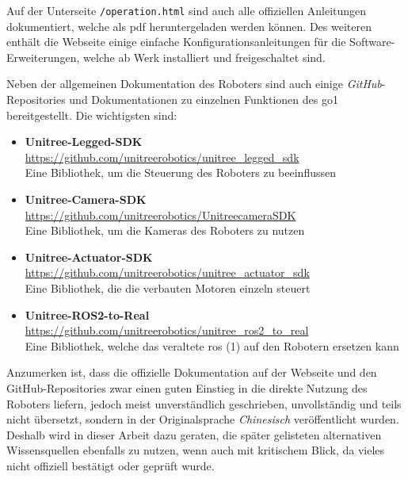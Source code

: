 Auf der Unterseite \texttt{/operation.html} sind auch alle offiziellen Anleitungen dokumentiert, welche als \gls{pdf} heruntergeladen
werden können.
Des weiteren enthält die Webseite einige einfache Konfigurationsanleitungen für die Software-Erweiterungen, welche ab
Werk installiert und freigeschaltet sind.

Neben der allgemeinen Dokumentation des Roboters sind auch einige \emph{GitHub}-Repositories und Dokumentationen zu einzelnen
Funktionen des \gls{go1} bereitgestellt.
Die wichtigsten sind:

\begin{itemize}
    \item \textbf{Unitree-Legged-SDK}\\
    \url{https://github.com/unitreerobotics/unitree\_legged\_sdk}\\
    \textrightarrow{} Eine Bibliothek, um die Steuerung des Roboters zu beeinflussen
    \item \textbf{Unitree-Camera-SDK}\\
    \url{https://github.com/unitreerobotics/UnitreecameraSDK}\\
    \textrightarrow{} Eine Bibliothek, um die Kameras des Roboters zu nutzen
    \item \textbf{Unitree-Actuator-SDK}\\
    \url{https://github.com/unitreerobotics/unitree\_actuator\_sdk}\\
    \textrightarrow{} Eine Bibliothek, die die verbauten Motoren einzeln steuert
    \item \textbf{Unitree-ROS2-to-Real}\\
    \url{https://github.com/unitreerobotics/unitree\_ros2\_to\_real}\\
    \textrightarrow{} Eine Bibliothek, welche das veraltete \gls{ros} (1) auf den Robotern ersetzen kann
\end{itemize}

Anzumerken ist, dass die offizielle Dokumentation auf der Webseite und den GitHub-Repositories zwar einen guten Einstieg
in die direkte Nutzung des Roboters liefern, jedoch meist unverständlich geschrieben, unvollständig und teils nicht übersetzt,
sondern in der Originalsprache \emph{Chinesisch} veröffentlicht wurden.
Deshalb wird in dieser Arbeit dazu geraten, die später gelisteten alternativen Wissensquellen ebenfalls zu nutzen, wenn auch mit kritischem Blick,
da vieles nicht offiziell bestätigt oder geprüft wurde.



